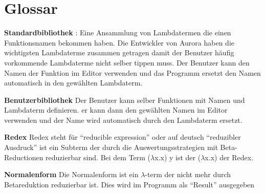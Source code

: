 \documentclass[parskip=full,11pt,twoside]{scrartcl}
\begin{document}



\section{Glossar}

\textbf{Standardbibliothek} :
Eine Ansammlung von Lambdatermen die einen Funktionsnamen bekommen haben. Die Entwickler von Aurora haben die wichtigsten Lambdaterme zusammen getragen damit der Benutzer häufig vorkommende Lambdaterme nicht selber tippen muss. Der Benutzer kann den Namen der Funktion im Editor verwenden und das Programm ersetzt den Namen automatisch in den gewählten Lambdaterm.

\textbf{Benutzerbibliothek}
Der Benutzer kann selber Funktionen mit Namen und Lambdaterm definieren. er kann dann den gewählten Namen im Editor verwenden und der Name wird automatisch durch den Lambdaterm ersetzt.

\textbf {Redex}
Redex steht für \enquote{reducible expression} oder auf deutsch \enquote{reduzibler Ausdruck} ist ein Subterm der durch die Auswertungsstrategien mit Beta-Reductionen reduzierbar sind. 
Bei dem Term ($\lambda$x.x) y ist der ($\lambda$x.x) der Redex.

\textbf{Normalenform}
Die Normalenform ist ein $\lambda$-term der nicht mehr durch Betareduktion reduzierbar ist. Dies wird im Programm als \enquote{Result} ausgegeben
\end{document}
